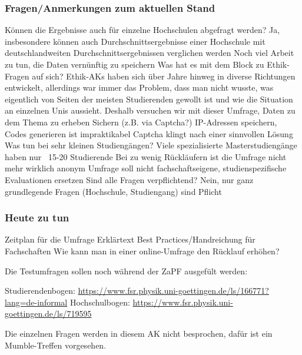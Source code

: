       \subsubsection*{Fragen/Anmerkungen zum aktuellen Stand}
        \begin{outline}
          \1 Können die Ergebnisse auch für einzelne Hochschulen abgefragt werden?
            \2 Ja, insbesondere können auch Durchschnittsergebnisse einer Hochschule mit deutschlandweiten Durchschnittsergebnissen verglichen werden
            \2 Noch viel Arbeit zu tun, die Daten vernünftig zu speichern
          \1 Was hat es mit dem Block zu Ethik-Fragen auf sich?
            \2 Ethik-AKs haben sich über Jahre hinweg in diverse Richtungen entwickelt, allerdings war immer das Problem, dass man nicht wusste, was eigentlich von Seiten der meisten Studierenden gewollt ist und wie die Situation an einzelnen Unis aussieht.
            \2 Deshalb versuchen wir mit dieser Umfrage, Daten zu dem Thema zu erheben
          \1 Sichern (z.B. via Captcha?)
            \2 IP-Adressen speichern, Codes generieren ist impraktikabel
            \2 Captcha klingt nach einer sinnvollen Lösung
          \1 Was tun bei sehr kleinen Studiengängen?
            \2 Viele spezialisierte Masterstudiengänge haben nur ~15-20 Studierende
            \2 Bei zu wenig Rückläufern ist die Umfrage nicht mehr wirklich anonym
            \2 Umfrage soll nicht fachschaftseigene, studienspezifische Evaluationen ersetzen
          \1 Sind alle Fragen verpflichtend?
            \2 Nein, nur ganz grundlegende Fragen (Hochschule, Studiengang) sind Pflicht
        \end{outline}

      \subsubsection*{Heute zu tun}
        \begin{outline}
          \1 Zeitplan für die Umfrage
          \1 Erklärtext
          \1 Best Practices/Handreichung für Fachschaften
            \2Wie kann man in einer online-Umfrage den Rücklauf erhöhen?
        \end{outline}

        Die Testumfragen sollen noch während der ZaPF ausgefült werden:
        \begin{outline}
          \1 Studierendenbogen: \url{https://www.fsr.physik.uni-goettingen.de/ls/166771?lang=de-informal}
          \1 Hochschulbogen: \url{https://www.fsr.physik.uni-goettingen.de/ls/719595}
        \end{outline}
        Die einzelnen Fragen werden in diesem AK nicht besprochen, dafür ist ein Mumble-Treffen vorgesehen.


